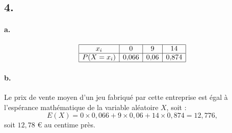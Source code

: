 \subsection*{4.}

\paragraph{a.}
\[
\begin{array}{|c|c|c|c|}
\hline
x_i & 0 & 9 & 14 \\
\hline
P(X = x_i) & 0{,}066 & 0{,}06 & 0{,}874 \\
\hline
\end{array}
\]

\paragraph{b.} Le prix de vente moyen d'un jeu fabriqué par cette entreprise est égal à l'espérance mathématique de la variable aléatoire \(X\), soit :
\[
E(X) = 0 \times 0{,}066 + 9 \times 0{,}06 + 14 \times 0{,}874 = 12{,}776,
\]
soit \( 12{,}78 \) € au centime près.
